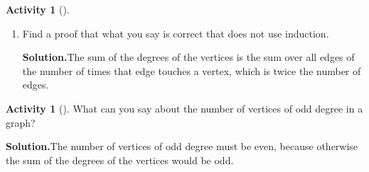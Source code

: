 \documentclass[10pt,]{book}
\theoremstyle{plain}
\theoremstyle{definition}
\newtheorem{activity}[project]{Activity}
\numberwithin{equation}{chapter}
\begin{document}
\begin{activity}[]
\begin{enumerate}[label=(\alph*)]
~\par
\item Find a proof that what you say is correct that does not use induction.%
\par\medskip\noindent%
\textbf{Solution.}\quad The sum of the degrees of the vertices is the sum over all edges of the number of times that edge touches a vertex, which is twice the number of edges.%

\end{enumerate}
\end{activity}
\begin{activity}[]\label{activity-95}
What can you say about the number of vertices of odd degree in a graph?%
\par\medskip\noindent%
\textbf{Solution.}\quad The number of vertices of odd degree must be even, because otherwise the sum of the degrees of the vertices would be odd.%
\end{activity}
\typeout{************************************************}
\typeout{************************************************}
\end{document}
